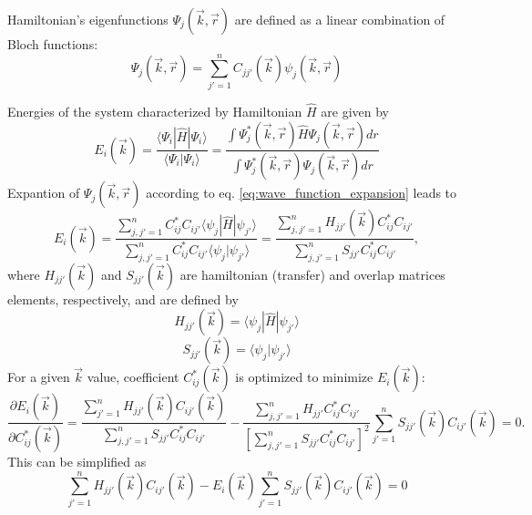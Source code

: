 Hamiltonian's eigenfunctions $\Psi_j(\vec{k}, \vec{r})$ are defined as a linear combination of Bloch functions:
\begin{equation} \label{eq:wave_function_expansion}
	\Psi_j(\vec{k}, \vec{r}) = \sum_{j'=1}^{n} C_{jj'}(\vec{k}) \psi_j(\vec{k}, \vec{r})
\end{equation}

Energies of the system characterized by Hamiltonian $\hat{H}$ are given by
\begin{equation}
	E_i(\vec{k}) = \frac{\langle \Psi_i | \hat{H} | \Psi_i \rangle}{\langle \Psi_i | \Psi_i \rangle} = \frac{\int \Psi^*_j(\vec{k}, \vec{r}) \hat{H} \Psi_j(\vec{k}, \vec{r}) dr}{\int \Psi^*_j(\vec{k}, \vec{r}) \Psi_j(\vec{k}, \vec{r}) dr}
\end{equation}
Expantion of $\Psi_j(\vec{k}, \vec{r})$ according to eq. \ref{eq:wave_function_expansion} leads to
\begin{equation}
	E_i(\vec{k}) = \frac{\sum\limits_{j,j'=1}^{n} C^*_{ij} C_{ij'} \langle \psi_j | \hat{H} | \psi_{j'} \rangle}{\sum\limits_{j,j'=1}^{n} C^*_{ij} C_{ij'} \langle \psi_j | \psi_{j'} \rangle} = \frac{\sum\limits_{j,j'=1}^{n} H_{jj'}(\vec{k}) C^*_{ij} C_{ij'}}{\sum\limits_{j,j'=1}^{n} S_{jj'} C^*_{ij} C_{ij'}},
\end{equation} 
where $H_{jj'}(\vec{k})$ and $S_{jj'}(\vec{k})$ are hamiltonian (transfer) and overlap matrices elements, respectively, and are defined by
\begin{equation}
	H_{jj'}(\vec{k}) = \langle \psi_j | \hat{H} | \psi_{j'} \rangle
\end{equation}
\begin{equation}
	S_{jj'}(\vec{k}) = \langle \psi_j | \psi_{j'} \rangle
\end{equation}
For a given $\vec{k}$ value, coefficient $C^*_{ij}(\vec{k})$ is optimized to minimize $E_i(\vec{k})$:
\begin{equation}
	\frac{\partial E_i (\vec{k})}{\partial C^*_{ij}(\vec{k})} = \frac{\sum\limits_{j'=1}^{n} H_{jj'}(\vec{k}) C_{ij'}(\vec{k})}{\sum\limits_{j,j'=1}^{n} S_{jj'} C^*_{ij} C_{ij'}} - \frac{\sum\limits_{j,j'=1}^{n} H_{jj'} C^*_{ij} C_{ij'}}{[\sum\limits_{j,j'=1}^{n} S_{jj'} C^*_{ij} C_{ij'}]^2} \sum\limits_{j'=1}^{n} S_{jj'}(\vec{k}) C_{ij'}(\vec{k}) = 0.
\end{equation}
This can be simplified as 
\begin{equation}
	\sum_{j'=1}^{n} H_{jj'}(\vec{k}) C_{ij'}(\vec{k}) - E_i(\vec{k}) \sum_{j'=1}^{n} S_{jj'}(\vec{k}) C_{ij'}(\vec{k}) = 0
\end{equation}


